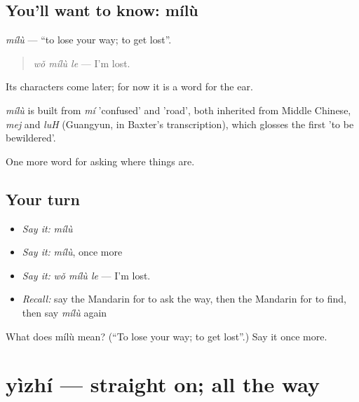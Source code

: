\subsection*{You'll want to know: mílù}
\emph{mílù} — \textquotedblleft{}to lose your way; to get lost\textquotedblright{}.

\begin{quote}
\emph{wǒ mílù le} — I'm lost.
\end{quote}

Its characters come later; for now it is a word for the ear.

\begin{cousinweb}
\emph{mílù} is built from \emph{mí} 'confused' and  'road', both inherited from Middle Chinese, \emph{mej} and \emph{luH} (Guangyun, in Baxter's transcription), which glosses the first 'to be bewildered'.
\end{cousinweb}

\begin{grammarlens}[title={What you've built}]
One more word for asking where things are.
\end{grammarlens}

\subsection*{Your turn}
\begin{itemize}
\raggedright
  \item \emph{Say it:} \emph{mílù}
  \item \emph{Say it:} \emph{mílù}, once more
  \item \emph{Say it:} \emph{wǒ mílù le} — I'm lost.
  \item \emph{Recall:} say the Mandarin for to ask the way, then the Mandarin for to find, then say \emph{mílù} again
\end{itemize}

\begin{tcolorbox}[breakable,colback=teal!4,colframe=teal!35!black,title={Before you move on}]
What does mílù mean? (\textquotedblleft{}To lose your way; to get lost\textquotedblright{}.) Say it once more.
\end{tcolorbox}
\section[yìzhí]{yìzhí — straight on; all the way}

\label{lesson:ZH-C197-yizhi}



